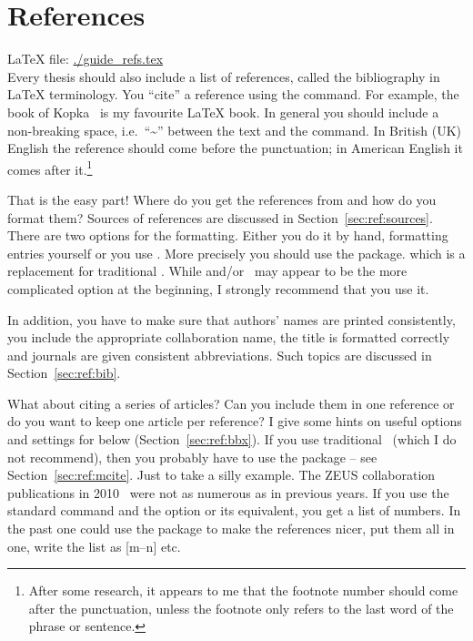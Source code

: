 \chapter{References}
\label{sec:ref}

\LaTeX{} file: \url{./guide_refs.tex}\\[1ex]
\noindent
Every thesis should also include a list of references, called the
bibliography in \LaTeX{} terminology. You \enquote{cite} a reference using
the  command. For example, the book of
Kopka~\cite{kopka04} is my favourite \LaTeX{} book. In general you
should include a non-breaking space, i.e.\ \enquote{\textasciitilde} between
the text and the  command. In British (UK) English the reference
should come before the punctuation; in American English it comes after
it.\footnote{After some research, it appears to me that the footnote
  number should come after the punctuation, unless the footnote only
  refers to the last word of the phrase or sentence.}

That is the easy part!  Where do you get the references from and how
do you format them? Sources of references are discussed in
Section~\ref{sec:ref:sources}.
There are two options for the formatting. Either you do it by
hand, formatting  entries yourself or you use
\BibTeX. 
More precisely you should use the  package.
which is a replacement for traditional \BibTeX.
While  and/or \BibTeX\ may appear to be the more complicated option
at the beginning, I strongly recommend that you use it.

In addition, you have to make sure that authors' names are
printed consistently, you include the appropriate collaboration
name, the title is formatted correctly and journals are given
consistent abbreviations. Such topics are discussed in
Section~\ref{sec:ref:bib}.

What about citing a series of articles? Can you
include them in one reference or do you want to keep one article per
reference?
I give some hints on
useful options and settings for  below (Section~\ref{sec:ref:bbx}).
If you use traditional \BibTeX\ (which I do not recommend), then you probably have to use the 
package -- see Section~\ref{sec:ref:mcite}.
Just to take a silly example. The ZEUS collaboration
publications in
2010~\cite{Abramowicz:2010ih,Abramowicz:2010xc,Abramowicz:2010nj} were
not as numerous as in previous years. If you use the standard
 command and the  option or its equivalent,
you get a list of numbers.  In the past one could use the
 package to make the references nicer, put them all in
one, write the list as [m--n] etc.


